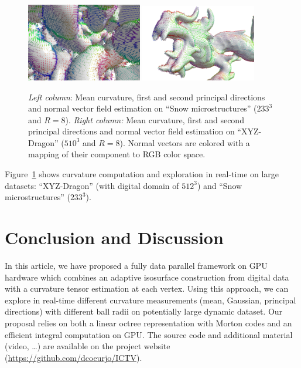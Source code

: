 \documentclass{llncs}
\begin{document}
\begin{figure}[p!]
\begin{center}
     {\includegraphics[width=0.45\textwidth]{figs/snow_r8_normales}}
     {\includegraphics[width=0.45\textwidth]{figs/dragon_r8_normales}}

   \end{center}
   \caption{\emph{Left column}: Mean curvature, first and second
     principal directions and normal vector field estimation on ``Snow microstructures'' ($233^3$ and $R=8$).
  \emph{Right column:} Mean curvature, first and second principal
  directions and normal vector field estimation on ``XYZ-Dragon'' ($510^3$
  and $R=8$). Normal vectors are colored with a mapping of their
  component to RGB color space.}\label{fig:adaptive}
   \vspace{-0.35cm}
 \end{figure}
 Figure~\ref{fig:adaptive} shows curvature computation and exploration in
 real-time on large datasets: ``XYZ-Dragon'' (with digital domain of $512^3$) and
 ``Snow microstructures'' ($233^3$).

\section{Conclusion and Discussion}
\label{sec:discussion}

In this article, we have proposed a fully data parallel framework on GPU
hardware which combines an adaptive isosurface construction from
digital data with a curvature tensor estimation at each vertex. Using
this approach, we can explore in real-time different curvature
measurements (mean, Gaussian, principal directions) with different
ball radii on potentially large dynamic dataset. Our proposal relies
on both a linear octree representation with Morton codes and an
efficient integral computation on GPU\@. The source code and additional
material (video, \ldots) are available on the project website
(\url{https://github.com/dcoeurjo/ICTV}).
\end{document}
